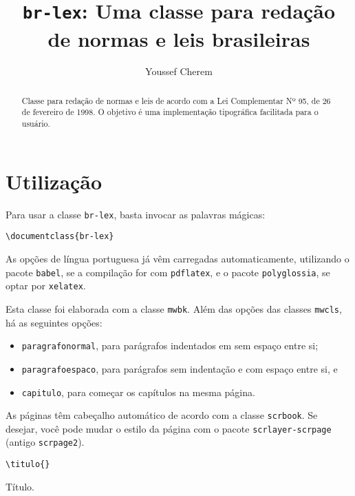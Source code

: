 \documentclass{ltxdoc}
\title{\texttt{br-lex}: Uma classe para redação\\ de normas e leis brasileiras}
\author{Youssef Cherem}
\newcommand{\nota}[1]{\marginpar{\hfill \cmd{#1}}}
\begin{document}
\maketitle

\begin{abstract}
Classe para redação de normas e leis de acordo com a Lei Complementar Nº 95, de 26 de fevereiro de 1998. O objetivo é uma implementação tipográfica facilitada para o usuário.
\end{abstract}

\section*{Utilização}

Para usar a classe \texttt{br-lex}, basta invocar as palavras mágicas: 

\begin{verbatim}
\documentclass{br-lex}
\end{verbatim}

As opções de língua portuguesa já vêm carregadas automaticamente, utilizando o pacote \texttt{babel}, se a compilação for com \texttt{pdflatex}, e o pacote \texttt{polyglossia}, se optar por \texttt{xelatex}. 

Esta classe foi elaborada com a classe \texttt{mwbk}. Além das opções das classes \texttt{mwcls}, há as seguintes opções: 

\begin{itemize}

\item 
\texttt{paragrafonormal}, para parágrafos indentados em sem espaço entre si; 

\item
\texttt{paragrafoespaco}, para parágrafos sem indentação e com espaço entre si, e 

\item 
\texttt{capitulo}, para começar os capítulos na mesma página.

\end{itemize}

As páginas têm cabeçalho automático de acordo com a classe \texttt{scrbook}. Se desejar, você pode mudar o estilo da página com o pacote \texttt{scrlayer-scrpage} (antigo \texttt{scrpage2}).



\begin{verbatim}\titulo{}
\end{verbatim}
\nota{\titulo\marg{Título}} 
Título.
\end{document}
